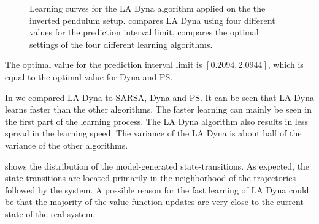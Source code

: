 \begin{figure}[htbp]
	\centering
	\caption[Inverted pendulum: \acs{LA Dyna} compared to \acs{PS}, Dyna and SARSA]{Learning curves for the \ac{LA Dyna} algorithm applied on the the inverted pendulum setup.  compares \ac{LA Dyna} using four different values for the prediction interval limit,  compares the optimal settings of the four different learning algorithms.}
	\label{fig:PS-LAcompared}
\end{figure}

The optimal value for the prediction interval limit is $[0.2094,2.0944]$, which is equal to the optimal value for Dyna and \ac{PS}.

In  we compared \ac{LA Dyna} to SARSA, Dyna and \ac{PS}. It can be seen that \ac{LA Dyna} learns faster than the other algorithms. The faster learning can mainly be seen in the first part of the learning process. The \ac{LA Dyna} algorithm also results in less spread in the learning speed. The variance of the \ac{LA Dyna} is about half of the variance of the other algorithms.

 shows the distribution of the model-generated state-transitions. As expected, the state-transitions are located primarily in the neighborhood of the trajectories followed by the system. A possible reason for the fast learning of \ac{LA Dyna} could be that the majority of the value function updates are very close to the current state of the real system.

